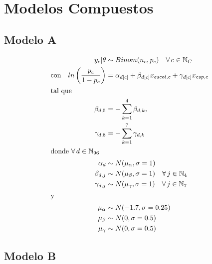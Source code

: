 \chapter{Modelos Compuestos}\label{Anexo_modelos_compuestos}

\section{Modelo A}

\begin{align}\label{eq:Modelo_Comp_A_Anexo}
y_c|\theta & \sim Binom(n_c,p_c) \quad \forall \, c \in \mathbb{N}_C \nonumber \\
\text{con} \quad ln\left(\dfrac{p_c}{1-p_c}\right) &= \alpha_{d[c]} + \beta_{d[c]} x_{escol,c} + \gamma_{d[c]} x_{csp,c} \\ 
\intertext{tal que} 
\beta_{d,5} &= -\sum\limits_{k = 1}^{4} \beta_{d,k}, \nonumber \\
\gamma_{d,8} &= -\sum\limits_{k = 1}^{7} \gamma_{d,k} \nonumber \\
\intertext{donde $\forall \, d \in \mathbb{N}_{96}$}
\alpha_d & \sim N(\mu_{\alpha}, \sigma=1) \quad  \nonumber \\
\beta_{d,j} & \sim N(\mu_{\beta}, \sigma=1) \quad \forall \, j \in \mathbb{N}_{4} \nonumber \\
\gamma_{d,j} & \sim N(\mu_{\gamma}, \sigma=1) \quad \forall \, j \in \mathbb{N}_{7} \nonumber \\
\intertext{y}
\mu_{\alpha} &\sim N(-1.7,\sigma=0.25) \nonumber \\
\mu_{\beta} &\sim N(0,\sigma=0.5) \nonumber \\
\mu_{\gamma} &\sim N(0,\sigma=0.5) \nonumber
\end{align}

\section{Modelo B}

